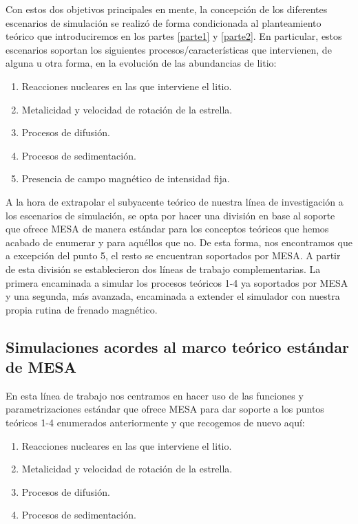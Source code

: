 Con estos dos objetivos principales en mente, la concepción de los diferentes escenarios de simulación se realizó de forma condicionada al planteamiento teórico que introduciremos en los partes \ref{parte1} y \ref{parte2}. En particular, estos escenarios soportan los siguientes procesos/características que intervienen, de alguna u otra forma, en la evolución de las abundancias de litio:

\begin{enumerate}
    \item Reacciones nucleares en las que interviene el litio.
    \item Metalicidad y velocidad de rotación de la estrella.
    \item Procesos de difusión.
    \item Procesos de sedimentación.
    \item Presencia de campo magnético de intensidad fija.
\end{enumerate}

A la hora de extrapolar el subyacente teórico de nuestra línea de investigación a los escenarios de simulación, se opta por hacer una división en base al soporte que ofrece MESA de manera estándar para los conceptos teóricos que hemos acabado de enumerar y para aquéllos que no. De esta forma, nos encontramos que a excepción del punto 5, el resto se encuentran soportados por MESA. A partir de esta división se establecieron dos líneas de trabajo complementarias. La primera encaminada a simular los procesos teóricos 1-4 ya soportados por MESA y una segunda, más avanzada, encaminada a extender el simulador con nuestra propia rutina de frenado magnético.\par

\subsection{Simulaciones acordes al marco teórico estándar de MESA}
En esta línea de trabajo nos centramos en hacer uso de las funciones y parametrizaciones estándar que ofrece MESA para dar soporte a los puntos teóricos 1-4 enumerados anteriormente y que recogemos de nuevo aquí:

\begin{enumerate}
    \item Reacciones nucleares en las que interviene el litio.
    \item Metalicidad y velocidad de rotación de la estrella.
    \item Procesos de difusión.
    \item Procesos de sedimentación.
\end{enumerate}

